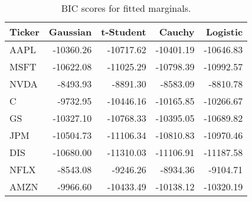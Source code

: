 \begin{table}[H]

\caption{BIC scores for fitted marginals.}
\centering
\fontsize{11}{13}\selectfont
\begin{tabular}[t]{lrrrr}
\toprule
Ticker & Gaussian & t-Student & Cauchy & Logistic\\
\midrule
AAPL & -10360.26 & -10717.62 & -10401.19 & -10646.83\\
MSFT & -10622.08 & -11025.29 & -10798.39 & -10992.57\\
NVDA & -8493.93 & -8891.30 & -8583.09 & -8810.78\\
C & -9732.95 & -10446.16 & -10165.85 & -10266.67\\
GS & -10327.10 & -10768.33 & -10395.05 & -10689.82\\
JPM & -10504.73 & -11106.34 & -10810.83 & -10970.46\\
DIS & -10680.00 & -11310.03 & -11106.91 & -11187.58\\
NFLX & -8543.08 & -9246.26 & -8934.36 & -9104.71\\
AMZN & -9966.60 & -10433.49 & -10138.12 & -10320.19\\
\bottomrule
\end{tabular}
\end{table}
